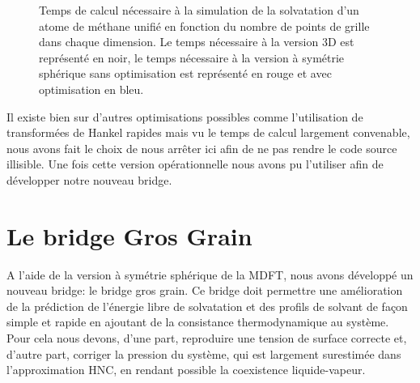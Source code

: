 \begin{figure}[ht]
  \centering
  \caption[Temps de calcul nécessaire à la simulation de la solvatation d'un atome de méthane unifié.]{Temps de calcul nécessaire à la simulation de la solvatation d'un atome de méthane unifié en fonction du nombre de points de grille dans chaque dimension. Le temps nécessaire à la version 3D est représenté en noir, le temps nécessaire à la version à symétrie sphérique sans optimisation est représenté en rouge et avec optimisation en bleu.}
  \label{fig:temps_calcul_methane_versions}
\end{figure}

Il existe bien sur d'autres optimisations possibles comme l'utilisation de transformées de Hankel rapides mais vu le temps de calcul largement convenable, nous avons fait le choix de nous arrêter ici afin de ne pas rendre le code source illisible. Une fois cette version opérationnelle nous avons pu l'utiliser afin de développer notre nouveau bridge.



\section{Le bridge Gros Grain}
A l'aide de la version à symétrie sphérique de la MDFT, nous avons développé un nouveau bridge: le bridge gros grain. Ce bridge doit permettre une amélioration de la prédiction de l'énergie libre de solvatation et des profils de solvant de façon simple et rapide en ajoutant de la consistance thermodynamique au système. Pour cela nous devons, d'une part, reproduire une tension de surface correcte et, d'autre part, corriger la pression du système, qui est largement surestimée dans l'approximation HNC, en rendant possible la coexistence liquide-vapeur. 

